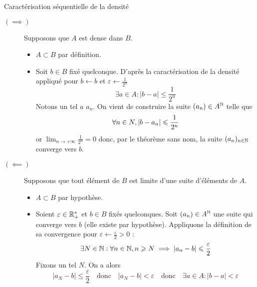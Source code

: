 \documentclass{article}
\renewenvironment{question_kholle}[2][ ]
{
	\subsection{\texorpdfstring{#2}{}}
	\notblank{#1}
	{
		\noindent #1
		\bigbreak
	}
	{}
	\begin{proof}
}
{
	\end{proof}
}
\begin{document}
\begin{question_kholle}{Caractérisation séquentielle de la densité}
	\hfill\\
	\begin{description}
		\item[$(\implies)$] Supposons que $A$ est dense dans $B$.
		      \begin{itemize}
			      \item $A\subset B$ par définition.
			      \item Soit $b\in B$ fixé quelconque. D’après la caractérisation de la densité appliqué pour $b\leftarrow b$ et $\varepsilon\leftarrow \frac{1}{2^{n}}$
			            \[
				            \exists a\in A: |b-a|\leq \frac{1}{2^{n}}
			            \]
			            Notons un tel $a$ $a_{n}$. On vient de construire la suite $(a_{n})\in A^{\N}$ telle que
			            \[
				            \forall n\in N, |b-a_{n}|\leq \frac{1}{2^{n}}\\
			            \]
			            or $\displaystyle\lim_{n\to +\infty}\frac{1}{2^{n}}=0$ donc, par le théorème sans nom, la suite $(a_{n})_{n\in\N}$ converge vers $b$.
		      \end{itemize}
		\item[$(\impliedby)$] Supposons que tout élément de $B$ est limite d’une suite d’éléments de $A$.
		      \begin{itemize}
			      \item $A\subset B$ par hypothèse.
			      \item Soient $\varepsilon\in\R_{+}^{*}$ et $b\in B$ fixés quelconques.
			            Soit $(a_{n})\in A^{\N}$ une suite qui converge vers $b$ (elle existe par hypothèse). Appliquons la définition de sa convergence pour $\varepsilon\leftarrow \frac{\varepsilon}{2}>0$ :
			            \[
				            \exists N\in\N: \forall n\in\N, n\geq N \implies |a_{n}-b|\leq \frac{\varepsilon}{2}
			            \]
			            Fixons un tel $N$. On a alors
			            \[
				            |a_{N}-b|\leq \frac{\varepsilon}{2} \quad \text{donc} \quad |a_{N}-b|<\varepsilon \quad \text{donc} \quad \exists a\in A: |b-a|<\varepsilon
			            \]
		      \end{itemize}
	\end{description}
\end{question_kholle}
\end{document}
